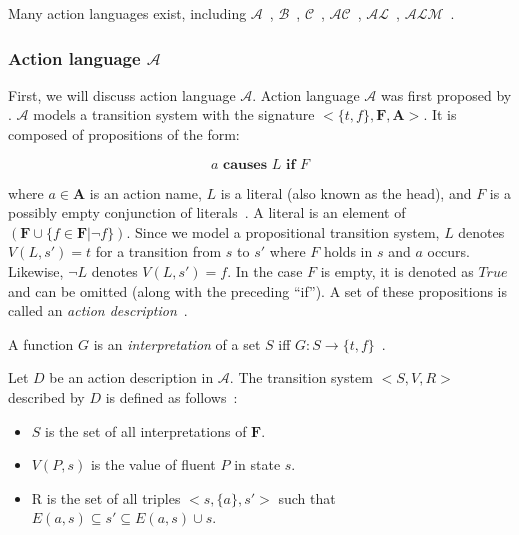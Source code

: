 Many action languages exist, including $ \mathcal{A} $~\citep{gelfond_action_1998}, $ \mathcal{B} $~\citep{gelfond_action_1998}, $ \mathcal{C} $~\citep{gelfond_action_1998}, $ \mathcal{AC} $~\citep{turner_representing_1997}, $ \mathcal{AL} $~\citep{baral_reasoning_2000}, $ \mathcal{ALM} $~\citep{inclezan_modular_2016}.

\subsubsection{Action language $ \mathcal{A} $}
\label{subsubsec:action_language_a}

First, we will discuss action language $ \mathcal{A} $.
Action language $ \mathcal{A} $ was first proposed by \citet{pednault_formulating_1987}.
$ \mathcal{A} $ models a transition system with the signature $ <\{t, f\}, \boldsymbol{F}, \boldsymbol{A}> $.
It is composed of propositions of the form:

\[
a \textbf{ causes } L \textbf{ if } F
\]

\noindent
where $ a \in \boldsymbol{A} $ is an action name, $ L $ is a literal (also known as the head), and $ F $ is a possibly empty conjunction of literals~\citep{gelfond_action_1998}.
A literal is an element of $(\boldsymbol{F} \cup \{f \in \boldsymbol{F} | \neg f\})$.
Since we model a propositional transition system, $L$ denotes $V(L, s') = t$ for a transition from $s$ to $s'$ where $F$ holds in $s$ and $a$ occurs.
Likewise, $\neg L$ denotes $V(L, s')=f$.
In the case $ F $ is empty, it is denoted as $ True $ and can be omitted (along with the preceding ``if'').
A set of these propositions is called an \textit{action description}~\citep{gelfond_action_1998}.

\begin{definition}
    A function $G$ is an \textit{interpretation} of a set $S$ iff $G: S \rightarrow \{t, f\}$~\citep{gelfond_action_1998}.
\end{definition}

\begin{definition}
    Let $ D $ be an action description in $ \mathcal{A} $.
    The transition system $ <S, V, R> $ described by $ D $ is defined as follows~\citep{gelfond_action_1998}:

    \begin{itemize}
        \item $ S $ is the set of all interpretations of $ \boldsymbol{F} $.
        \item $ V(P, s) $ is the value of fluent $P$ in state $s$.
        \item R is the set of all triples $ <s, \{a\}, s'> $ such that $ E(a,s) \subseteq s' \subseteq E(a,s) \cup s $.
    \end{itemize}
\end{definition}

